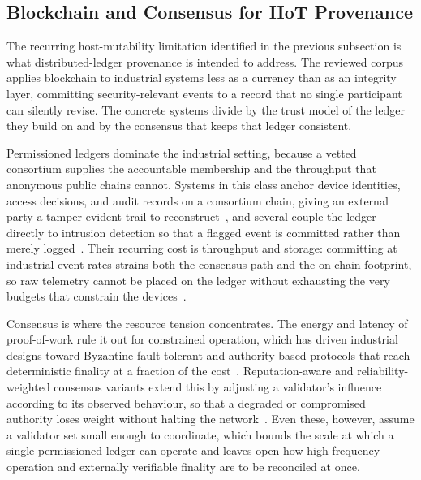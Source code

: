 \subsection{Blockchain and Consensus for IIoT Provenance}
\label{subsec:soa-ledger}

The recurring host-mutability limitation identified in the previous subsection
is what distributed-ledger provenance is intended to address. The reviewed
corpus applies blockchain to industrial systems less as a currency than as an
integrity layer, committing security-relevant events to a record that no single
participant can silently revise. The concrete systems divide by the trust model
of the ledger they build on and by the consensus that keeps that ledger
consistent.

Permissioned ledgers dominate the industrial setting, because a vetted
consortium supplies the accountable membership and the throughput that
anonymous public chains cannot. Systems in this class anchor device identities,
access decisions, and audit records on a consortium chain, giving an external
party a tamper-evident trail to reconstruct~\cite{samriya2025workload,
salam2026secure}, and several couple the ledger directly to intrusion detection
so that a flagged event is committed rather than merely
logged~\cite{song2025hybrid, peng2025bctdics}. Their recurring cost is
throughput and storage: committing at industrial event rates strains both the
consensus path and the on-chain footprint, so raw telemetry cannot be placed on
the ledger without exhausting the very budgets that constrain the
devices~\cite{xiong2025sharding, ding2025dcstorage}.

Consensus is where the resource tension concentrates. The energy and latency of
proof-of-work rule it out for constrained operation, which has driven industrial
designs toward Byzantine-fault-tolerant and authority-based protocols that reach
deterministic finality at a fraction of the cost~\cite{zheng2025trbft,
wu2025dbpbft}. Reputation-aware and reliability-weighted consensus variants
extend this by adjusting a validator's influence according to its observed
behaviour, so that a degraded or compromised authority loses weight without
halting the network~\cite{zeng2025ibft, xiong2025reputation}. Even these,
however, assume a validator set small enough to coordinate, which bounds the
scale at which a single permissioned ledger can operate and leaves open how
high-frequency operation and externally verifiable finality are to be reconciled
at once.

